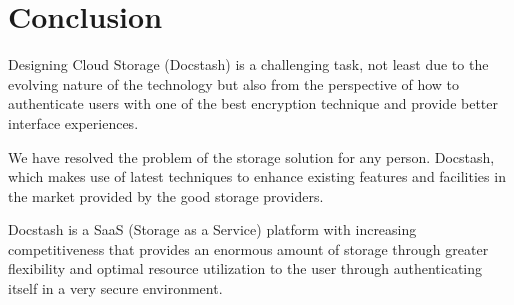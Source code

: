 \chapter{Conclusion}
\newpage
\par Designing Cloud Storage (Docstash) is a challenging task, not least due to the evolving nature of the technology but also from the perspective of how to authenticate users with one of the best encryption technique and provide better interface experiences.
\par We have resolved the problem of the storage solution for any person. Docstash, which makes use of latest techniques to enhance existing features and facilities in the market provided by the good storage providers. 
\par Docstash is a SaaS (Storage as a Service) platform with increasing competitiveness that provides an enormous amount of storage through greater flexibility and optimal resource utilization to the user through authenticating itself in a very secure environment.